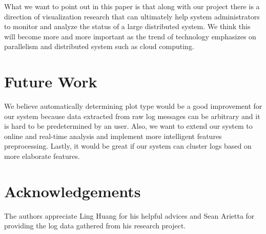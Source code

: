 \documentclass[conference]{style/acmsiggraph}
\begin{document}
What we want to point out in this paper is that along with our project there is a direction of
visualization research that can ultimately help system administrators to monitor and analyze the
status of a large distributed system. We think this will become more and more important as the trend
of technology emphasizes on parallelism and distributed system such as cloud computing.


\section{Future Work}

We believe automatically determining plot type would be a good improvement for our system because
data extracted from raw log messages can be arbitrary and it is hard to be predetermined by an user.
Also, we want to extend our system to online and real-time analysis and implement more intelligent
features preprocessing. Lastly, it would be great if our system can cluster logs based on more
elaborate features.

\section*{Acknowledgements}
The authors appreciate Ling Huang for his helpful advices and Sean Arietta for providing the log
data gathered from his research project.




\end{document}

